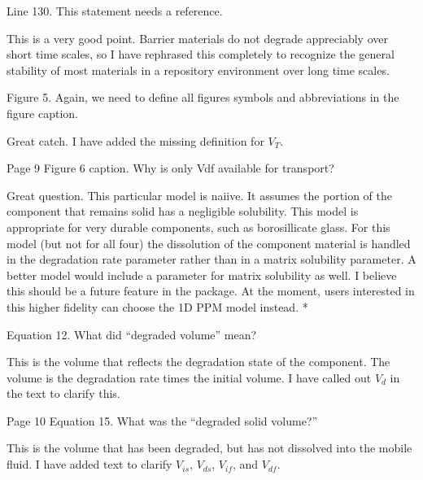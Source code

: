 \documentclass[answers,12pt]{exam}
\begin{document}
\begin{questions}
\question Line 130. This statement needs a reference.

\begin{solution}
This is a very good point. Barrier materials do not degrade appreciably over 
short time scales, so I 
have rephrased this completely to recognize the general 
stability of most materials in a repository environment over long time scales. 
\end{solution}

\question Figure 5. Again, we need to define all figures symbols and abbreviations in the figure caption.
\begin{solution}
Great catch. I have added the missing definition for $V_T$. 
\end{solution}

\question Page 9 Figure 6 caption. Why is only Vdf available for transport?
\begin{solution}
Great question. This particular model is naiive. It assumes the portion of the 
        component that remains solid  has a negligible solubility. This model 
        is appropriate for very durable components, such as borosillicate 
        glass.  For this model (but not for all four) the dissolution of the 
        component material is handled in the degradation rate parameter rather 
        than in a matrix solubility parameter. A better model would include a 
        parameter for matrix solubility as well. I believe this should be a 
        future feature in the package. At the moment, users interested in this 
        higher fidelity can choose the 1D PPM model instead. 
        {\color{red}*}
\end{solution}

\question Equation 12. What did ``degraded volume'' mean?
\begin{solution}
This is the volume that reflects the degradation state of the component. The 
        volume is the degradation rate times the initial volume. I have called 
        out $V_d$ in the text to clarify this.
\end{solution}

\question Page 10 Equation 15. What was the ``degraded solid volume?''
\begin{solution}
        This is the volume that has been degraded, but has not dissolved into 
        the mobile fluid. I have 
        added text to clarify
        $V_{is}$,  
        $V_{ds}$, 
        $V_{if}$, and
        $V_{df}$. 
\end{solution}
 


\end{questions}
\end{document}

